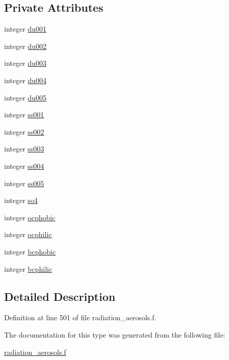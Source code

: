 \subsection*{Private Attributes}
\begin{DoxyCompactItemize}
\item 
integer \hyperlink{group__module__radiation__aerosols_gaf4355efd112704adbaeab5a3fd1d7912}{du001}
\item 
integer \hyperlink{group__module__radiation__aerosols_gab68920703fa2cda7cbc42cb568a2ed56}{du002}
\item 
integer \hyperlink{group__module__radiation__aerosols_ga9b2422518e2c8aaba9f0b64bd0c4676a}{du003}
\item 
integer \hyperlink{group__module__radiation__aerosols_ga69658f70ffccecfae1751c227ec1b14c}{du004}
\item 
integer \hyperlink{group__module__radiation__aerosols_gaabd67af89106955952b0010bb3a70e4e}{du005}
\item 
integer \hyperlink{group__module__radiation__aerosols_gacce0ecff4d4e84dffc0c23965053ac36}{ss001}
\item 
integer \hyperlink{group__module__radiation__aerosols_ga9e96ed67b1e072d97314bc9e6e09eee7}{ss002}
\item 
integer \hyperlink{group__module__radiation__aerosols_ga5aef8974607bb85ae1a23598a402adfb}{ss003}
\item 
integer \hyperlink{group__module__radiation__aerosols_ga88d0024b6f7f6fa3ae4e1da0e9ce7db8}{ss004}
\item 
integer \hyperlink{group__module__radiation__aerosols_ga3c67144cb8aeedfb6c51c474a5072605}{ss005}
\item 
integer \hyperlink{group__module__radiation__aerosols_gaa73b4be9d303cfce2c00407204c5f930}{so4}
\item 
integer \hyperlink{group__module__radiation__aerosols_ga3ace1c1bbade423efd216e676511c470}{ocphobic}
\item 
integer \hyperlink{group__module__radiation__aerosols_ga95e99f68fc7344f78f2ee316bc447651}{ocphilic}
\item 
integer \hyperlink{group__module__radiation__aerosols_ga4b1c1a1b44b5eb68ec19abb48e748fa0}{bcphobic}
\item 
integer \hyperlink{group__module__radiation__aerosols_ga776ae744bfaad492a1aeccf32864d1a0}{bcphilic}
\end{DoxyCompactItemize}


\subsection{Detailed Description}


Definition at line 501 of file radiation\+\_\+aerosols.\+f.



The documentation for this type was generated from the following file\+:\begin{DoxyCompactItemize}
\item 
\hyperlink{radiation__aerosols_8f}{radiation\+\_\+aerosols.\+f}\end{DoxyCompactItemize}
